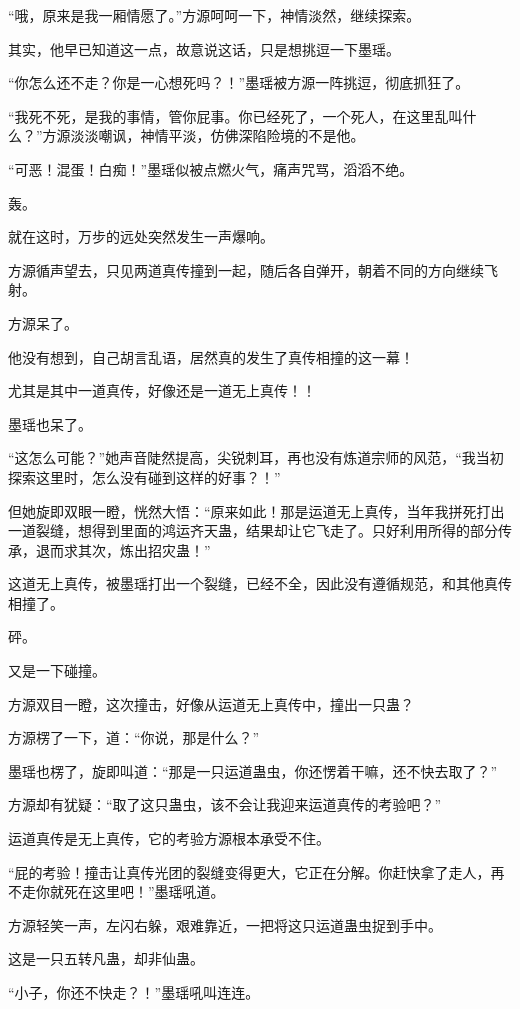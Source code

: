 \begin{this_body}
“哦，原来是我一厢情愿了。”方源呵呵一下，神情淡然，继续探索。

其实，他早已知道这一点，故意说这话，只是想挑逗一下墨瑶。

“你怎么还不走？你是一心想死吗？！”墨瑶被方源一阵挑逗，彻底抓狂了。

“我死不死，是我的事情，管你屁事。你已经死了，一个死人，在这里乱叫什么？”方源淡淡嘲讽，神情平淡，仿佛深陷险境的不是他。

“可恶！混蛋！白痴！”墨瑶似被点燃火气，痛声咒骂，滔滔不绝。

轰。

就在这时，万步的远处突然发生一声爆响。

方源循声望去，只见两道真传撞到一起，随后各自弹开，朝着不同的方向继续飞射。

方源呆了。

他没有想到，自己胡言乱语，居然真的发生了真传相撞的这一幕！

尤其是其中一道真传，好像还是一道无上真传！！

墨瑶也呆了。

“这怎么可能？”她声音陡然提高，尖锐刺耳，再也没有炼道宗师的风范，“我当初探索这里时，怎么没有碰到这样的好事？！”

但她旋即双眼一瞪，恍然大悟：“原来如此！那是运道无上真传，当年我拼死打出一道裂缝，想得到里面的鸿运齐天蛊，结果却让它飞走了。只好利用所得的部分传承，退而求其次，炼出招灾蛊！”

这道无上真传，被墨瑶打出一个裂缝，已经不全，因此没有遵循规范，和其他真传相撞了。

砰。

又是一下碰撞。

方源双目一瞪，这次撞击，好像从运道无上真传中，撞出一只蛊？

方源楞了一下，道：“你说，那是什么？”

墨瑶也楞了，旋即叫道：“那是一只运道蛊虫，你还愣着干嘛，还不快去取了？”

方源却有犹疑：“取了这只蛊虫，该不会让我迎来运道真传的考验吧？”

运道真传是无上真传，它的考验方源根本承受不住。

“屁的考验！撞击让真传光团的裂缝变得更大，它正在分解。你赶快拿了走人，再不走你就死在这里吧！”墨瑶吼道。

方源轻笑一声，左闪右躲，艰难靠近，一把将这只运道蛊虫捉到手中。

这是一只五转凡蛊，却非仙蛊。

“小子，你还不快走？！”墨瑶吼叫连连。


\end{this_body}
